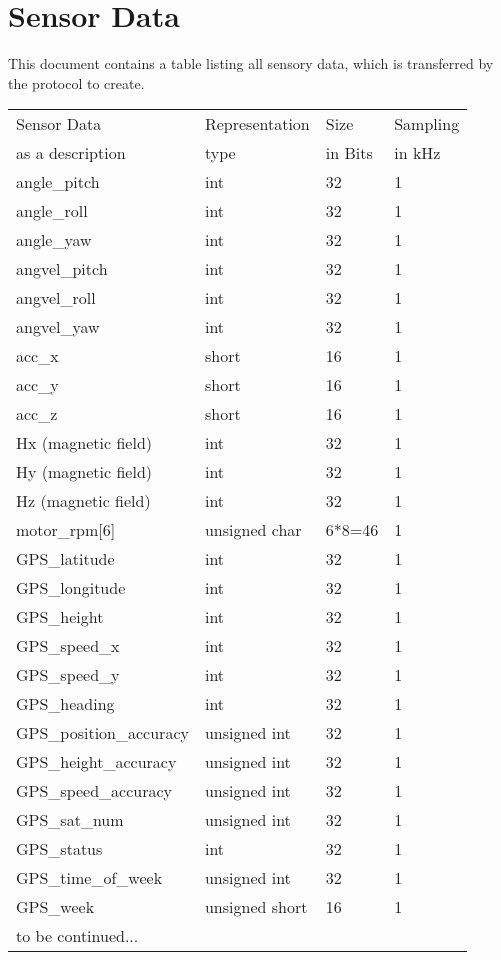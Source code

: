 \section{Sensor Data}

This document contains a table listing all sensory data, which is transferred by the protocol to create.
\newline \newline

\begin{tabular}{p{4cm} C{3cm} C{3cm} C{3cm}}

\hline 
 Sensor Data & Representation & Size & Sampling\\
 as a description & type &in Bits & in kHz \\
\hline 

angle\_pitch & int & 32 & 1 \\
angle\_roll & int & 32 & 1 \\
angle\_yaw & int & 32 & 1 \\
angvel\_pitch & int & 32 & 1 \\
angvel\_roll & int & 32 & 1 \\
angvel\_yaw & int & 32 & 1 \\
acc\_x & short & 16 & 1 \\
acc\_y & short & 16 & 1 \\
acc\_z & short & 16 & 1 \\
Hx (magnetic field)& int & 32 & 1 \\
Hy (magnetic field)& int & 32 & 1 \\
Hz (magnetic field)& int & 32 & 1 \\
motor\_rpm[6] & unsigned char & 6*8=46 & 1\\
GPS\_latitude & int & 32 & 1 \\
GPS\_longitude & int & 32 & 1 \\
GPS\_height & int & 32 & 1 \\
GPS\_speed\_x & int & 32 & 1 \\
GPS\_speed\_y & int & 32 & 1 \\
GPS\_heading & int & 32 & 1 \\
GPS\_position\_accuracy & unsigned int & 32 & 1 \\
GPS\_height\_accuracy & unsigned int & 32 & 1 \\
GPS\_speed\_accuracy & unsigned int & 32 & 1 \\
GPS\_sat\_num & unsigned int & 32 & 1 \\
GPS\_status & int & 32 & 1 \\
GPS\_time\_of\_week & unsigned int & 32 & 1 \\
GPS\_week & unsigned short & 16 & 1 \\

to be continued...





 
\end{tabular}
